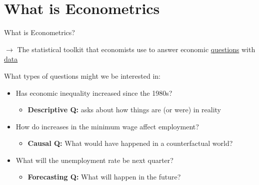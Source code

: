 \documentclass[11pt,english]{beamer}
\begin{document}
\section{What is Econometrics}
\begin{frame}{What is Econometrics?}

\vspace{0.2cm}
$\rightarrow$ The statistical toolkit that economists use to answer economic \uline{questions} with \uline{data}
\vspace{0.25cm} \pause

What types of questions might we be interested in: 
\vspace{0.25cm}

\begin{itemize}
\item<1-> Has economic inequality increased since the 1980s?
	\begin{itemize}
		\item<3-> \textbf{Descriptive Q:} asks about how things are (or were) in reality
	\end{itemize}
\item<1-> How do increases in the minimum wage affect employment? 
	\begin{itemize}
		\item<4-> \textbf{Causal Q:} What would have happened in a counterfactual world?  
	\end{itemize}
\item<1->   What will the unemployment rate be next quarter?
	\begin{itemize}
	\item<5-> \textbf{Forecasting Q:} What will happen in the future?  
\end{itemize}

\end{itemize}
\vspace{0.25cm}

\pause 
{}

\end{frame}
\end{document}

